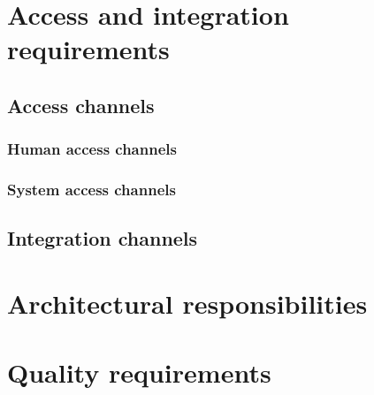\documentclass[a4paper,12pt]{article}
\begin{document}
\newpage
\setlength{\voffset}{-3cm}

\section{Access and integration requirements}
\subsection{Access channels}
\subsubsection{Human access channels} %
\subsubsection{System access channels}%


\subsection{Integration channels}

\section{Architectural responsibilities}

\section{Quality requirements}
\end{document}
